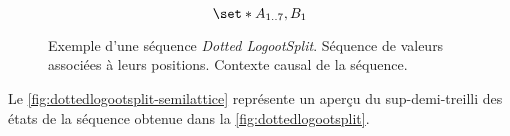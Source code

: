 \begin{figure}[tb]
\centering
\begin{subfigure}[b]{0.69\linewidth}
    \centering
    \caption{}\label{fig:dottedlogootsplit-1}
\end{subfigure}
\begin{subfigure}[b]{0.29\linewidth}
    \centering
    \begin{equation*}
        \set*{A_{\irange{1}{7}},B_1}
    \end{equation*}
    \caption{}\label{fig:dottedlogootsplit-2}
\end{subfigure}
\caption[Exemple d'une séquence \emph{LogootSplit}]{Exemple d'une séquence \emph{Dotted LogootSplit}.
 Séquence de valeurs associées à leurs positions.
 Contexte causal de la séquence.}\label{fig:dottedlogootsplit}
\end{figure}

Le \autoref{fig:dottedlogootsplit-semilattice} représente un aperçu du sup-demi-treilli des états de la séquence obtenue dans la \autoref{fig:dottedlogootsplit}.


